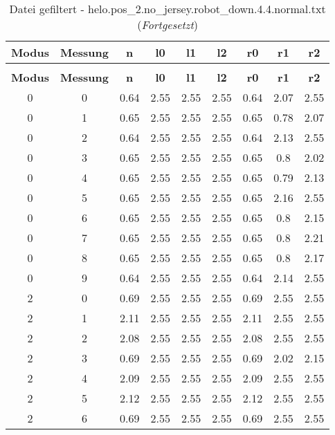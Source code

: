 \begin{longtable}{|c|c||c||c|c|c||c|c|c|}
	\caption{Datei gefiltert - helo.pos\_2.no\_jersey.robot\_down.4.4.normal.txt} \label{tab:helo.pos-2.no-jersey.robot-down.4.4.normal.txt} \\ \hline
	\textbf{Modus} & \textbf{Messung} & \textbf{n} & \textbf{l0} & \textbf{l1} & \textbf{l2} & \textbf{r0} & \textbf{r1} & \textbf{r2}\\ \hline
	\endfirsthead
	\caption[]{Datei gefiltert - helo.pos\_2.no\_jersey.robot\_down.4.4.normal.txt (\emph{Fortgesetzt})} \\ \hline
	\textbf{Modus} & \textbf{Messung} & \textbf{n} & \textbf{l0} & \textbf{l1} & \textbf{l2} & \textbf{r0} & \textbf{r1} & \textbf{r2}\\ \hline
	\endhead
	0 & 0 & 0.64 & 2.55 & 2.55 & 2.55 & 0.64 & 2.07 & 2.55 \\ \hline
	0 & 1 & 0.65 & 2.55 & 2.55 & 2.55 & 0.65 & 0.78 & 2.07 \\ \hline
	0 & 2 & 0.64 & 2.55 & 2.55 & 2.55 & 0.64 & 2.13 & 2.55 \\ \hline
	0 & 3 & 0.65 & 2.55 & 2.55 & 2.55 & 0.65 & 0.8 & 2.02 \\ \hline
	0 & 4 & 0.65 & 2.55 & 2.55 & 2.55 & 0.65 & 0.79 & 2.13 \\ \hline
	0 & 5 & 0.65 & 2.55 & 2.55 & 2.55 & 0.65 & 2.16 & 2.55 \\ \hline
	0 & 6 & 0.65 & 2.55 & 2.55 & 2.55 & 0.65 & 0.8 & 2.15 \\ \hline
	0 & 7 & 0.65 & 2.55 & 2.55 & 2.55 & 0.65 & 0.8 & 2.21 \\ \hline
	0 & 8 & 0.65 & 2.55 & 2.55 & 2.55 & 0.65 & 0.8 & 2.17 \\ \hline
	0 & 9 & 0.64 & 2.55 & 2.55 & 2.55 & 0.64 & 2.14 & 2.55 \\ \hline
	2 & 0 & 0.69 & 2.55 & 2.55 & 2.55 & 0.69 & 2.55 & 2.55 \\ \hline
	2 & 1 & 2.11 & 2.55 & 2.55 & 2.55 & 2.11 & 2.55 & 2.55 \\ \hline
	2 & 2 & 2.08 & 2.55 & 2.55 & 2.55 & 2.08 & 2.55 & 2.55 \\ \hline
	2 & 3 & 0.69 & 2.55 & 2.55 & 2.55 & 0.69 & 2.02 & 2.15 \\ \hline
	2 & 4 & 2.09 & 2.55 & 2.55 & 2.55 & 2.09 & 2.55 & 2.55 \\ \hline
	2 & 5 & 2.12 & 2.55 & 2.55 & 2.55 & 2.12 & 2.55 & 2.55 \\ \hline
	2 & 6 & 0.69 & 2.55 & 2.55 & 2.55 & 0.69 & 2.55 & 2.55 \\ \hline

\end{longtable}
